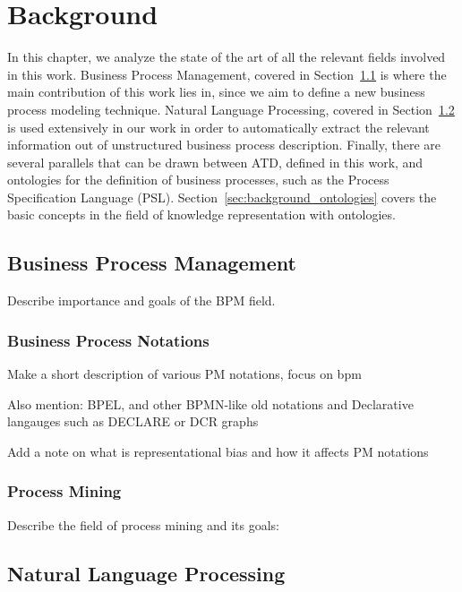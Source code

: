 \chapter{Background}
\label{cha:background}

In this chapter, we analyze the state of the art of all the relevant fields
involved in this work. Business Process Management, covered in
Section~\ref{sec:background_bpm} is where the main contribution of this work
lies in, since we aim to define a new business process modeling technique.
Natural Language Processing, covered in Section~\ref{sec:background_nlp} is used
extensively in our work in order to automatically extract the relevant
information out of unstructured business process description. Finally, there are
several parallels that can be drawn between ATD, defined in this work, and
ontologies for the definition of business processes, such as the Process
Specification Language (PSL). Section~\ref{sec:background_ontologies} covers the basic
concepts in the field of knowledge representation with ontologies.

\section{Business Process Management}
\label{sec:background_bpm}


Describe importance and goals of the BPM field.

\subsection{Business Process Notations}

Make a short description of various PM notations, focus on bpm

Also mention: BPEL, and other BPMN-like old notations and Declarative langauges such as DECLARE or DCR graphs

Add a note on what is representational bias and how it affects PM notations

\subsection{Process Mining}

Describe the field of process mining and its goals:


\section{Natural Language Processing}
\label{sec:background_nlp}

